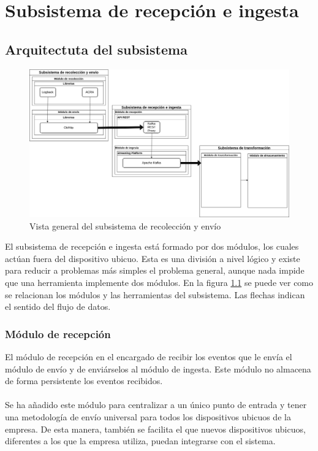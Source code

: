 \chapter{Subsistema de recepción e ingesta}

\section{Arquitectuta del subsistema}

\begin{figure}[!htb]
	\includegraphics[width=\linewidth]{Moduloss-subrecing.png}
	\caption{Vista general del subsistema de recolección y envío}
	\label{fig:subrecing}
\end{figure}

El subsistema de recepción e ingesta está formado por dos módulos, los cuales actúan fuera del dispositivo ubicuo. Esta es una división a nivel lógico y existe para reducir a problemas más simples el problema general, aunque nada impide que una herramienta implemente dos módulos. En la figura \ref{fig:subrecing} se puede ver como se relacionan los módulos y las herramientas del subsistema. Las flechas indican el sentido del flujo de datos.

\subsection{Módulo de recepción}

El módulo de recepción en el encargado de recibir los eventos que le envía el módulo de envío y de enviárselos al módulo de ingesta. Este módulo no almacena de forma persistente los eventos recibidos.
\\\\
Se ha añadido este módulo para centralizar a un único punto de entrada y tener una metodología de envío universal para todos los dispositivos ubicuos de la empresa. De esta manera, también se facilita el que nuevos dispositivos ubicuos, diferentes a los que la empresa utiliza, puedan integrarse con el sistema.

